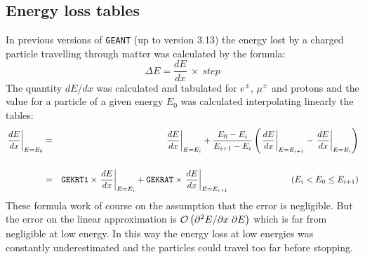 \subsection{Energy loss tables}
In previous versions of {\tt GEANT} (up to version 3.13) the energy lost by
a charged particle travelling through matter was calculated by the
formula:
\[ \Delta E = \frac{dE}{dx} \: \times \: step
\]
The quantity $dE/dx$ was calculated and tabulated for $e^{\pm}$,
$\mu^{\pm}$ and protons and the value for a particle of a given energy
$E_0$ was calculated interpolating linearly the tables:
\begin{eqnarray}
\left. \frac{dE}{dx} \right|_{E=E_0} & = &
\left. \frac{dE}{dx} \right|_{E=E_i} + \frac{E_0-E_i}{E_{i+1}-E_i}
\left ( \left. \frac{dE}{dx} \right|_{E=E_{i+1}} -
\left. \frac{dE}{dx} \right|_{E=E_i} \right ) \vspace{.3cm} \\[5mm]
& = & \mbox{\tt GEKRT1} \times \left. \frac{dE}{dx} \right|_{E=E_i} +
\mbox{\tt GEKRAT} \times \left. \frac{dE}{dx} \right|_{E=E_{i+1}}
\hspace{2.5cm} (E_i < E_0 \leq E_{i+1})
\nonumber
\end{eqnarray}
These formula work of course on the assumption that the error is
negligible. But the error on the linear approximation is ${\cal O}
\left ( \partial^2E/\partial x \; \partial E \right )$ which is 
far from negligible at
low energy. In this way the energy loss at low energies was constantly
underestimated and the particles could travel too far before stopping.
 
